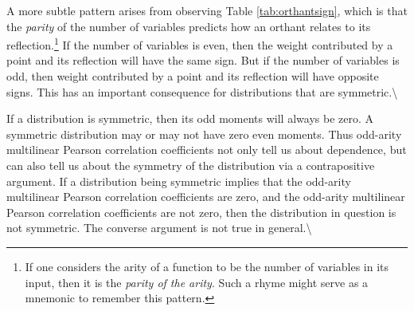 \documentclass[
  letterpaper,
  DIV=11,
  numbers=noendperiod]{scrreprt}
\begin{document}
A more subtle pattern arises from observing Table \ref{tab:orthantsign},
which is that the \textit{parity} of the number of variables predicts
how an orthant relates to its
reflection.\footnote{If one considers the arity of a function to be the number of variables in its input, then it is the \textit{parity of the arity}. Such a rhyme might serve as a mnemonic to remember this pattern.}
If the number of variables is even, then the weight contributed by a
point and its reflection will have the same sign. But if the number of
variables is odd, then weight contributed by a point and its reflection
will have opposite signs. This has an important consequence for
distributions that are symmetric.\textbackslash{}

If a distribution is symmetric, then its odd moments will always be
zero. A symmetric distribution may or may not have zero even moments.
Thus odd-arity multilinear Pearson correlation coefficients not only
tell us about dependence, but can also tell us about the symmetry of the
distribution via a contrapositive argument. If a distribution being
symmetric implies that the odd-arity multilinear Pearson correlation
coefficients are zero, and the odd-arity multilinear Pearson correlation
coefficients are not zero, then the distribution in question is not
symmetric. The converse argument is not true in general.\textbackslash{}
\end{document}
